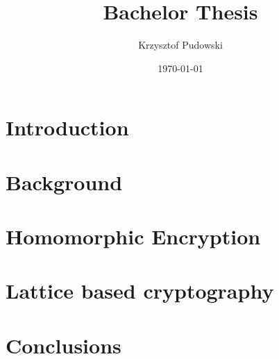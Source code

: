 \documentclass[11pt,a4paper]{article}
\title{Bachelor Thesis}
\author{Krzysztof Pudowski}
\date{\today}
\theoremstyle{plain}
\theoremstyle{definition}
\theoremstyle{remark}
\begin{document}



{\hypersetup{hidelinks} \tableofcontents}

\section{Introduction}


\section{Background}


\section{Homomorphic Encryption}


\section{Lattice based cryptography}


\section{Conclusions}


\newpage
\printbibliography
{}

%
\end{document}
